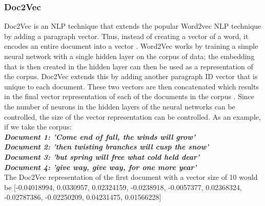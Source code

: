 \documentclass[conference]{IEEEtran}
\begin{document}
\subsubsection{Doc2Vec}
Doc2Vec is an NLP technique that extends the popular Word2vec NLP technique by adding a paragraph vector. Thus, instead of creating a vector of a word, it encodes an entire document into a vector \cite{doc2vec}. Word2Vec works by training a simple neural network with a single hidden layer on the corpus of data; the embedding that is then created in the hidden layer can then be used as a representation of the corpus. Doc2Vec extends this by adding another paragraph ID vector that is unique to each document. These two vectors are then concatenated which results in the final vector representation of each of the documents in the corpus \cite{doc2vec-explained}. Since the number of neurons in the hidden layers of the neural networks can be controlled, the size of the vector representation can be controlled. As an example, if we take the corpus:\\
\textit{\textbf{Document 1: 'Come end of fall, the winds will grow' \\
Document 2: 'then twisting branches will cusp the snow' \\
Document 3: 'but spring will free what cold held dear'\\ 
Document 4: 'give way, give way, for one more year'\\}}
The Doc2Vec representation of the first document with a vector size of 10 would be $[$-0.04018994, 0.0330957, 0.02324159, -0.0238918, -0.0057377, 0.02368324, -0.02787386, -0.02250209, 0.04231475, 0.01566228$]$
\end{document}
